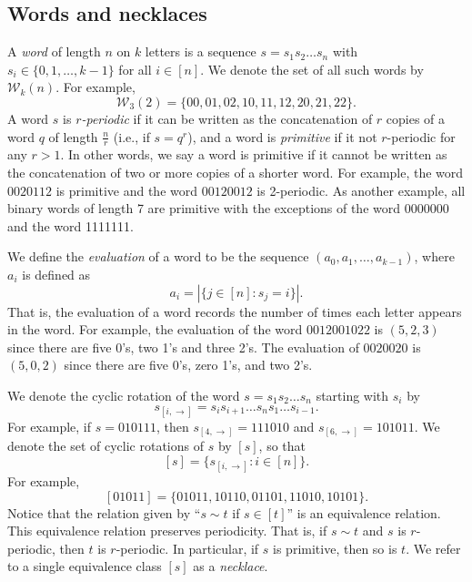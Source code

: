 \documentclass[12pt]{article}
\newcommand{\todo}[1]{\vspace{2 mm}\par\noindent
   \marginpar[\flushright\textsc{ToDo}]{\textsc{ToDo}}\framebox{\begin{minipage}[c]{\textwidth}
   \tt #1 \end{minipage}}\vspace{2 mm}\par}
\newcommand{\W}{\mathcal{W}}
\theoremstyle{plain}
\theoremstyle{definition}
\begin{document}
\subsection{Words and necklaces}
A \textit{word} of length $n$ on $k$ letters is a sequence $s = s_1s_2\ldots s_n$ with $s_i \in \{0,1, \ldots, k-1\}$ for all $i\in[n]$. We denote the set of all such words by $\W_k(n)$. For example, $$\W_3(2)=\{00, 01, 02, 10, 11, 12, 20, 21, 22\}.$$ A word $s$ is \textit{$r$-periodic} if it can be written as the concatenation of $r$ copies of a word $q$ of length $\frac{n}{r}$ (i.e., if $s = q^r$), and a word is \textit{primitive} if it not $r$-periodic for any $r>1$. In other words, we say a word is primitive if it cannot be written as the concatenation of two or more copies of a shorter word. For example, the word $0020112$ is primitive and the word $00120012$ is 2-periodic. As another example, all binary words of length 7 are primitive with the exceptions of the word 0000000 and  the word 1111111.

We define the \textit{evaluation} of a word to be the sequence $(a_0, a_1, \ldots, a_{k-1})$, where $a_i$ is defined as $$a_i=|\{j \in [n] : s_j = i\}|.$$ That is, the evaluation of a word records the number of times each letter appears in the word. For example, the evaluation of the word $0012001022$ is $(5,2,3)$ since there are five 0's, two 1's and three 2's. The evaluation of $0020020$ is $(5, 0, 2)$ since there are five 0's, zero 1's, and two 2's. 

We denote the cyclic rotation of the word $s=s_1s_2\ldots s_n$ starting with $s_i$ by $$s_{[i,\rightarrow]} = s_is_{i+1}\ldots s_ns_1\ldots s_{i-1}.$$ For example, if $s=010111$, then $s_{[4,\rightarrow]} = 111010$ and $s_{[6,\rightarrow]}=101011.$ We denote the set of cyclic rotations of $s$ by $[s]$, so that $$[s]=\{s_{[i,\rightarrow]}: i \in [n]\}.$$ For example, $$[01011]=\{01011,10110, 01101,11010, 10101\}.$$ Notice that the relation given by ``$s\sim t$ if $s\in[t]$'' is an equivalence relation. This equivalence relation preserves periodicity. That is, if $s\sim t$ and $s$ is $r$-periodic, then $t$ is $r$-periodic. In particular, if $s$ is primitive, then so is $t$. We refer to a single equivalence class $[s]$ as a \textit{necklace}.  
\end{document}
